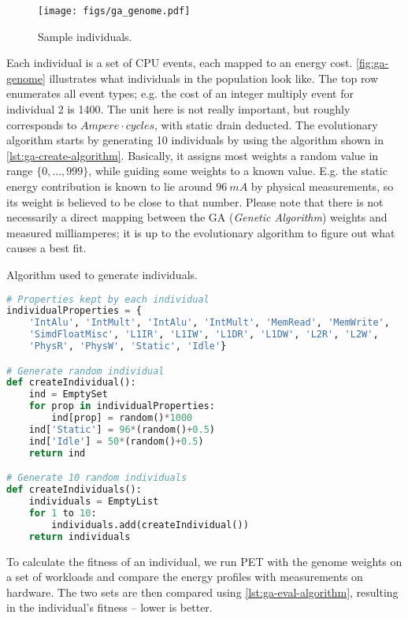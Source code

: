 \begin{figure}[hbt]
    \centering
    \def\svgwidth{\columnwidth}
    \texttt{[image: figs/ga\_genome.pdf]}
    \caption{Sample individuals.}
    \label{fig:ga-genome}
\end{figure}

Each individual is a set of CPU events, each mapped to an energy cost.
\autoref{fig:ga-genome} illustrates what individuals in the population look
like. The top row enumerates all event types; e.g. the cost of an integer
multiply event for individual 2 is 1400. The unit here is not really important,
but roughly corresponds to $Ampere \cdot cycles$, with static drain deducted.
The evolutionary algorithm starts by generating 10 individuals by using the
algorithm shown in \autoref{lst:ga-create-algorithm}. Basically, it assigns most
weights a random value in range $\{0, \ldots, 999\}$, while guiding some weights
to a known value. E.g. the static energy contribution is known to lie around
$96~mA$ by physical measurements, so its weight is believed to be close to that
number. Please note that there is not necessarily a direct mapping between the
GA (\emph{Genetic Algorithm}) weights and measured milliamperes; it is up to the
evolutionary algorithm to figure out what causes a best fit.

\begin{algorithm}
\caption{Algorithm used to generate individuals.}
\label{lst:ga-create-algorithm}
\begin{lstlisting}[language=python,style=algo]
# Properties kept by each individual
individualProperties = {
    'IntAlu', 'IntMult', 'IntAlu', 'IntMult', 'MemRead', 'MemWrite',
    'SimdFloatMisc', 'L1IR', 'L1IW', 'L1DR', 'L1DW', 'L2R', 'L2W',
    'PhysR', 'PhysW', 'Static', 'Idle'}

# Generate random individual
def createIndividual():
    ind = EmptySet
    for prop in individualProperties:
        ind[prop] = random()*1000
    ind['Static'] = 96*(random()+0.5)
    ind['Idle'] = 50*(random()+0.5)
    return ind

# Generate 10 random individuals
def createIndividuals():
    individuals = EmptyList
    for 1 to 10:
        individuals.add(createIndividual())
    return individuals
\end{lstlisting}
\end{algorithm}

To calculate the fitness of an individual, we run PET with the genome weights on
a set of workloads and compare the energy profiles with measurements on
hardware. The two sets are then compared using \autoref{lst:ga-eval-algorithm},
resulting in the individual's fitness -- lower is better.

